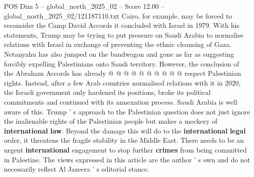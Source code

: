 \begin{textsample}{POS Dim 5 – global\_north\_2025\_02 – Score 12.00 – global\_north\_2025\_02/121187110.txt}
Cairo, for example, may be forced to reconsider the Camp David Accords it concluded with Israel in 1979.
With his statements, Trump may be trying to put pressure on Saudi Arabia to normalise relations with Israel in exchange of preventing the ethnic cleansing of Gaza.
Netanyahu has also jumped on the bandwagon and gone as far as suggesting forcibly expelling Palestinians onto Saudi territory.
However, the conclusion of the Abraham Accords has already @ @ @ @ @ @ @ @ @ @ respect Palestinian rights.
Instead, after a few Arab countries normalised relations with it in 2020, the Israeli government only hardened its positions, broke its political commitments and continued with its annexation process.
Saudi Arabia is well aware of this.
Trump ' s approach to the Palestinian question does not just ignore the inalienable rights of the Palestinian people but makes a mockery of \textbf{international} \textbf{law}.
Beyond the damage this will do to the \textbf{international} \textbf{legal} order, it threatens the fragile stability in the Middle East.
There needs to be an urgent \textbf{international} engagement to stop further \textbf{crimes} from being committed in Palestine.
The views expressed in this article are the author ' s own and do not necessarily reflect Al Jazeera ' s editorial stance.

\end{textsample}
